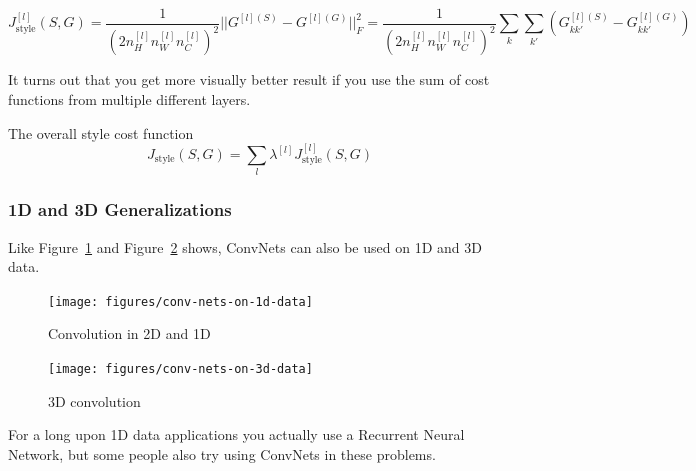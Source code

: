 \documentclass[UTF8]{article}
\begin{document}
$$ J_{\text{style}}^{[l]}(S, G) = \frac{1}{(2 n_H^{[l]} n_W^{[l]} n_C^{[l]})^2}
|| G^{[l](S)} - G^{[l](G)} ||_F^2 = \frac{1}{(2 n_H^{[l]} n_W^{[l]} n_C^{[l]})^2} \sum_k \sum_{k'}
(G_{kk'}^{[l](S)} - G_{kk'}^{[l](G)}) $$

It turns out that you get more visually better result if you use the sum of cost functions from
multiple different layers.

The overall style cost function
$$ J_{\text{style}}(S, G) = \sum_l \lambda^{[l]} J_{\text{style}}^{[l]}(S, G) $$

\subsubsection{1D and 3D Generalizations}
Like Figure~\ref{fig:conv-nets-on-1d-data} and Figure~\ref{fig:conv-nets-on-3d-data} shows,
ConvNets can also be used on 1D and 3D data.

\begin{figure}[htb]
    \centering
    \texttt{[image: figures/conv-nets-on-1d-data]}
    \caption{Convolution in 2D and 1D}
    \label{fig:conv-nets-on-1d-data}
\end{figure}

\begin{figure}[htb]
    \centering
    \texttt{[image: figures/conv-nets-on-3d-data]}
    \caption{3D convolution}
    \label{fig:conv-nets-on-3d-data}
\end{figure}

For a long upon 1D data applications you actually use a Recurrent Neural Network, but some people
also try using ConvNets in these problems.
\end{document}
